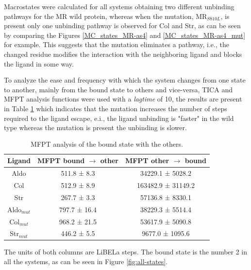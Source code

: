 \documentclass[
  journal=usp, %
  manuscript=final-report,
  year=2023,
  volume=1,
]{cup-journal}
\begin{document}
Macrostates were calculated for all systems obtaining two different unbinding pathways for the MR wild protein, whereas when the mutation, MR$_{S810L}$, is present only one unbinding pathway is observed for Col and Str, as can be seen by comparing the Figures \ref{MC_states_MR-as4} and \ref{MC_states_MR-as4_mut} for example. This suggests that the mutation eliminates a pathway, i.e., the changed residue  modifies the interaction with the neighboring ligand and blocks the ligand in some way.

To analyze the ease and frequency with which the system changes from one state to another, mainly from the bound state to others and vice-versa, TICA and MFPT analysis functions were used with a \textit{lagtime} of 10, the results are present in Table \ref{MFPT_bound} which indicates that the mutation increases the number of steps required to the ligand escape, e.i., the ligand unbinding is "faster" in the wild type whereas the mutation is present the unbinding is slower.

\begin{table}[htb]
\begin{threeparttable}
\caption{MFPT analysis of the bound state with the others.}
\label{MFPT_bound}
\begin{tabular}{|c|c|c|}
\toprule
\headrow \textbf{Ligand} & \textbf{MFPT bound $\bm{\to}$ other} & \textbf{MFPT other $\bm{\to}$ bound} \\\midrule
Aldo            & 511.8 ±   8.3 & 34229.1 ± 5028.2 \\ %
Col             & 512.9 ±   8.9 & 163482.9 ± 31149.2 \\%
Str             & 267.7 ±   3.3 & 57136.8 ± 8330.1 \\ \hline
Aldo$_{mut}$    & 797.7 ±  16.4 & 38229.3 ± 5514.4 \\ 
Col$_{mut}$     & 968.2 ±  21.5 & 53617.9 ± 5090.8 \\ %
Str$_{mut}$     & 446.2 ±   5.5 & 9677.0 ± 1095.6 \\ %
\bottomrule
\end{tabular}
\begin{tablenotes}[hang]
\item[] The units of both columns are LiBELa steps. The bound state is the number 2 in all the systems, as can be seen in Figure \ref{fig:all-states}.
\end{tablenotes}
\end{threeparttable}
\end{table}
\end{document}
